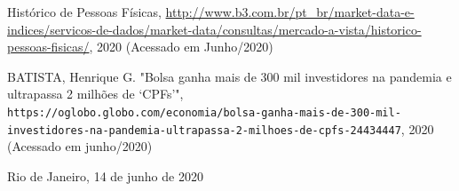 \documentclass[a4paper,12pt,oneside,openany]{report}
\begin{document}
\begin{thebibliography}{}

Histórico de Pessoas Físicas, 
\url{http://www.b3.com.br/pt\_br/market-data-e-indices/servicos-de-dados/market-data/consultas/mercado-a-vista/historico-pessoas-fisicas/}, 2020 (Acessado em Junho/2020)

 BATISTA, Henrique G. 
"Bolsa ganha mais de 300 mil investidores na pandemia e ultrapassa 2 milhões de ‘CPFs’", 
\\\texttt{https://oglobo.globo.com/economia/bolsa-ganha-mais-de-300-mil-investidores-na-pandemia-ultrapassa-2-milhoes-de-cpfs-24434447}, 2020 (Acessado em junho/2020)

\end{thebibliography}

      \vspace{2cm}
      \noindent
Rio de Janeiro, 14 de junho de 2020

      \vspace{0.5cm}
      \begin{flushright}
         \parbox{10cm}{
            \hrulefill

            \vspace{-.375cm}

            \vspace{0.9cm}
            \hrulefill

            \vspace{-.375cm}
 
            \vspace{0.9cm}
         }
      \end{flushright}
      \vfill
      
\end{document}
